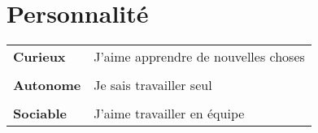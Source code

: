 \documentclass[a4paper, 12pt]{article}
\begin{document}
\begin{minipage}[t]{0.35\textwidth}
    \section*{\textcolor{sectioncolor}{Personnalité}}
    \begin{tabular}{ m{} m{} }
        \textbf{Curieux} & J'aime apprendre de nouvelles choses \\
        & \\
        \textbf{Autonome} & Je sais travailler seul \\
        & \\
        \textbf{Sociable} & J'aime travailler en équipe
    \end{tabular}

\end{minipage}
\end{document}
